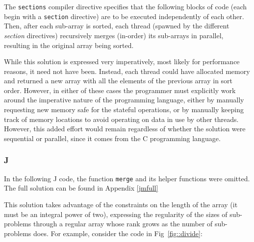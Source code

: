 \noindent The \texttt{sections} compiler directive
specifies that the following blocks of code (each begin with a \texttt{section} directive) 
are to be executed independently of each other\cite{openmp}. 
Then, after each sub-array is sorted, each thread (spawned by the different \textit{section} directives) 
recursively merges (in-order) its sub-arrays in parallel, resulting in the original array being sorted.

While this solution is expressed very imperatively, most likely for performance reasons, it need not have been. 
Instead, each thread could have allocated memory and returned a new array with all the elements of the previous array in sort order.
However, in either of these cases the programmer must explicitly work around the 
imperative nature of the programming language, either by manually requesting new memory safe for the stateful operations, 
or by manually keeping track of memory locations to avoid operating on data in use by other threads.
However, this added effort would remain regardless of whether the solution were sequential or parallel, 
since it comes from the C programming language.

\subsubsection{J}
\label{jmerge}
In the following J code, the function \texttt{merge} and its helper functions were omitted.
The full solution can be found in Appendix \ref{jmfull}

\begin{singlespacing}
\begin{small}

\end{small}
\end{singlespacing}

\noindent This solution takes advantage of the constraints on the length of the array (it must be an integral power of two), 
expressing the regularity of the sizes of sub-problems through a regular array 
whose rank grows as the number of sub-problems does.
For example, consider the code in Fig~\ref{fig::divide}: 

